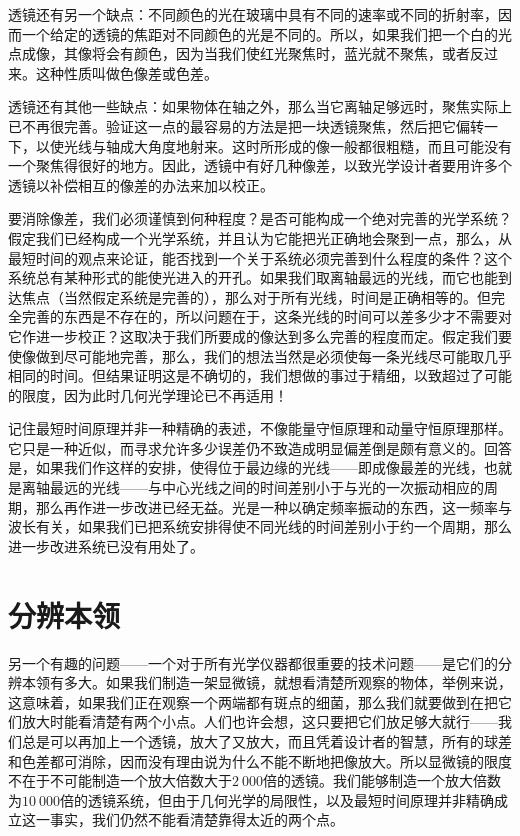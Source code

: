透镜还有另一个缺点：不同颜色的光在玻璃中具有不同的速率或不同的折射率，因而一个给定的透镜的焦距对不同颜色的光是不同的。所以，如果我们把一个白的光点成像，其像将会有颜色，因为当我们使红光聚焦时，蓝光就不聚焦，或者反过来。这种性质叫做色像差或色差。

透镜还有其他一些缺点：如果物体在轴之外，那么当它离轴足够远时，聚焦实际上已不再很完善。验证这一点的最容易的方法是把一块透镜聚焦，然后把它偏转一下，以使光线与轴成大角度地射来。这时所形成的像一般都很粗糙，而且可能没有一个聚焦得很好的地方。因此，透镜中有好几种像差，以致光学设计者要用许多个透镜以补偿相互的像差的办法来加以校正。

要消除像差，我们必须谨慎到何种程度？是否可能构成一个绝对完善的光学系统？假定我们已经构成一个光学系统，并且认为它能把光正确地会聚到一点，那么，从最短时间的观点来论证，能否找到一个关于系统必须完善到什么程度的条件？这个系统总有某种形式的能使光进入的开孔。如果我们取离轴最远的光线，而它也能到达焦点（当然假定系统是完善的），那么对于所有光线，时间是正确相等的。但完全完善的东西是不存在的，所以问题在于，这条光线的时间可以差多少才不需要对它作进一步校正？这取决于我们所要成的像达到多么完善的程度而定。假定我们要使像做到尽可能地完善，那么，我们的想法当然是必须使每一条光线尽可能取几乎相同的时间。但结果证明这是不确切的，我们想做的事过于精细，以致超过了可能的限度，因为此时几何光学理论已不再适用！

记住最短时间原理并非一种精确的表述，不像能量守恒原理和动量守恒原理那样。它只是一种近似，而寻求允许多少误差仍不致造成明显偏差倒是颇有意义的。回答是，如果我们作这样的安排，使得位于最边缘的光线——即成像最差的光线，也就是离轴最远的光线——与中心光线之间的时间差别小于与光的一次振动相应的周期，那么再作进一步改进已经无益。光是一种以确定频率振动的东西，这一频率与波长有关，如果我们已把系统安排得使不同光线的时间差别小于约一个周期，那么进一步改进系统已没有用处了。

\section{分辨本领}

另一个有趣的问题——一个对于所有光学仪器都很重要的技术问题——是它们的分辨本领有多大。如果我们制造一架显微镜，就想看清楚所观察的物体，举例来说，这意味着，如果我们正在观察一个两端都有斑点的细菌，那么我们就要做到在把它们放大时能看清楚有两个小点。人们也许会想，这只要把它们放足够大就行——我们总是可以再加上一个透镜，放大了又放大，而且凭着设计者的智慧，所有的球差和色差都可消除，因而没有理由说为什么不能不断地把像放大。所以显微镜的限度不在于不可能制造一个放大倍数大于$2~000$倍的透镜。我们能够制造一个放大倍数为$10~000$倍的透镜系统，但由于几何光学的局限性，以及最短时间原理并非精确成立这一事实，我们仍然不能看清楚靠得太近的两个点。

